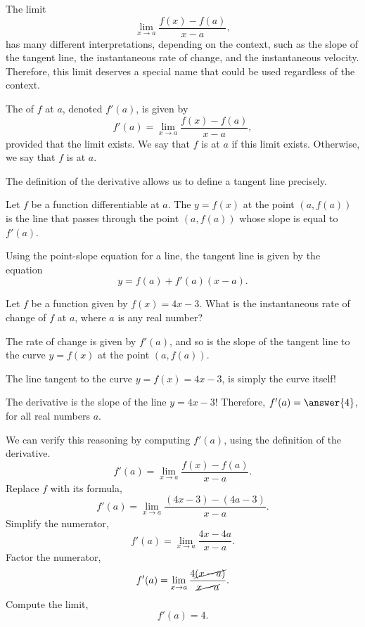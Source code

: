 \documentclass{ximera}
\begin{document}
The limit \[ \lim_{x\to a} \frac{f(x)-f(a)}{x-a},\] 
has many different interpretations, depending on the context, such as the slope of the tangent line, 
the instantaneous rate of change, and the instantaneous velocity.
Therefore, this limit deserves a special name that could be used regardless of the context.

\begin{definition}
	 The  of $f$ at $a$, denoted $f'(a)$, is given by
	  \[ f'(a) = \lim_{x\to a} \frac{f(x) - f(a)}{x-a}, \]
	provided that the limit exists. We say that $f$ is 
	at $a$ if  this limit exists. Otherwise,  we say that  $f$ is  at $a$.
\end{definition}

The definition of the derivative allows us to define a tangent line precisely.
\begin{definition}
 	Let $f$ be a function differentiable at $a$. The  $y=f(x)$ at the point $(a,f(a))$ is 
 	the line that passes through the point $(a,f(a))$ whose slope is equal to $f'(a)$.
 \end{definition}
  
Using the point-slope equation for a line, the tangent line is given by the equation
\[ y = f(a)+f'(a)(x-a). \]

\begin{question}
	Let $f$ be a function given by $f(x) = 4x-3$.
	What is the instantaneous rate of change of $f$ at $a$, where $a$ is any real number?
	\begin{hint}
		The rate of change is given by $f'(a)$, and so is the slope of the tangent line to the curve $y=f(x)$ at the point $(a,f(a))$.
	\end{hint}
	\begin{hint}
		The line tangent to the curve $y=f(x) = 4x-3$, is simply the curve itself!
	\end{hint}
	\begin{prompt}
		The derivative is the slope of the line $y= 4x-3$! Therefore,  $f'(a)=\answer{4}$, for all real numbers $a$.
	\end{prompt}
	\begin{hint}
		 We can verify this reasoning by computing $f'(a)$, using the definition of the derivative.
		 \[ f'(a) = \lim_{x\to a} \frac{f(x) - f(a)}{x-a}.\]
		Replace $f$ with its formula,
		\[  f'(a) = \lim_{x\to a} \frac{(4x-3)-(4a-3)}{x-a}.\]
		Simplify the numerator,
		\[ f'(a) = \lim_{x\to a} \frac{4x-4a}{x-a}.\]
		Factor the numerator,
		\[ f'(a) = \lim_{x\to a} \frac{4\cancel{(x-a)}}{\cancel{x-a}}.\]
		 Compute the limit,
		\[ f'(a) =4.\]
	\end{hint}
\end{question}
\end{document}
